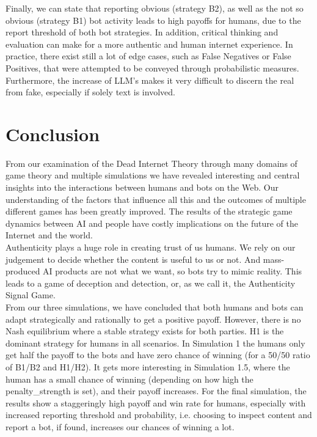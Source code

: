 \documentclass{article}
\begin{document}
 Finally, we can state that reporting obvious (strategy B2), as well as the not so obvious (strategy B1) bot activity leads to high payoffs for humans, due to the report threshold of both bot strategies. In addition, critical thinking and evaluation can make for a more authentic and human internet experience. In practice, there exist still a lot of edge cases, such as False Negatives or False Positives, that were attempted to be conveyed through probabilistic measures. Furthermore, the increase of LLM's makes it very difficult to discern the real from fake, especially if solely text is involved. 


\newpage

\section{Conclusion}%
From our examination of the Dead Internet Theory through many domains of game theory and multiple simulations we have revealed interesting and central insights into the interactions between humans and bots on the Web. Our understanding of the factors that influence all this and the outcomes of multiple different games has been greatly improved. The results of the strategic game dynamics between AI and people have costly implications on the future of the Internet and the world. \\

Authenticity plays a huge role in creating trust of us humans. We rely on our judgement to decide whether the content is useful to us or not. And mass-produced AI products are not what we want, so bots try to mimic reality. This leads to a game of deception and detection, or, as we call it, the Authenticity Signal Game.\\

From our three simulations, we have concluded that both humans and bots can adapt strategically and rationally to get a positive payoff. However, there is no Nash equilibrium where a stable strategy exists for both parties. H1 is the dominant strategy for humans in all scenarios. In Simulation 1 the humans only get half the payoff to the bots and have zero chance of winning (for a 50/50 ratio of B1/B2 and H1/H2). It gets more interesting in Simulation 1.5, where the human has a small chance of winning (depending on how high the penalty\_strength is set), and their payoff increases. For the final simulation, the results show a staggeringly high payoff and win rate for humans, especially with increased reporting threshold and probability, i.e. choosing to inspect content and report a bot, if found, increases our chances of winning a lot.\\
\end{document}
